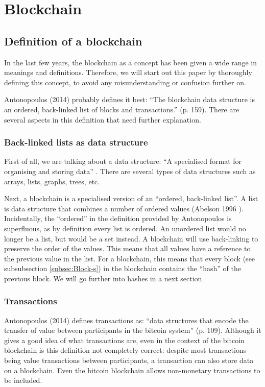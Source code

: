 \section{Blockchain}

\subsection{Definition of a blockchain}

In the last few years, the blockchain as a concept has been given a wide range in meanings and definitions. Therefore, we will start out this paper by thoroughly defining this concept, to avoid any misunderstanding or confusion further on.

Antonopoulos (2014) \cite{antonopoulos:2014} probably defines it best: ``The blockchain data structure is an ordered, back-linked list of blocks and transactions.'' (p. 159). There are several aspects in this definition that need further explanation.

\subsubsection{Back-linked lists as data structure}

First of all, we are talking about a data structure: ``A specialised format for organising and storing data'' \cite{data-structure}. There are several types of data structures such as arrays, lists, graphs, trees, etc.

Next, a blockchain is a specialised version of an ``ordered, back-linked list''. A list is data structure that combines a number of ordered values (Abelson 1996 \cite{abelson:1996}).  Incidentally, the ``ordered'' in the definition provided by Antonopoulos is superfluous, as by definition every list is ordered. An unordered list would no longer be a list, but would be a set instead. A blockchain will use back-linking to preserve the order of the values. This means that all values have a reference to the previous value in the list. For a blockchain, this means that every block (see subsubsection \ref{subsec:Block-s}) in the blockchain contains the ``hash'' of the previous block. We will go further into hashes in a next section.

\subsubsection{Transactions}

Antonopoulos (2014) \cite{antonopoulos:2014} defines transactions as: ``data structures that encode the transfer of value between participants in the bitcoin system'' (p. 109). Although it gives a good idea of what transactions are, even in the context of the bitcoin blockchain is this definition not completely correct: despite most transactions being value transactions between participants, a transaction can also store data on a blockchain. Even the bitcoin blockchain allows non-monetary transactions to be included.

